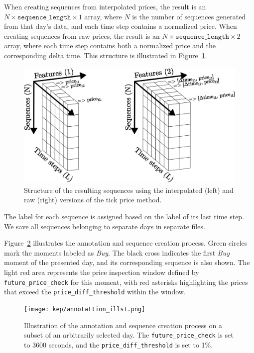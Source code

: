 \documentclass[a4paper,oneside,onecolumn,12pt]{book}
\begin{document}
		When creating sequences from interpolated prices, the result is an $N \times \texttt{sequence\_length} \times 1$ array, where $N$ is the number of sequences generated from that day's data, and each time step contains a normalized price. When creating sequences from raw prices, the result is an $N \times \texttt{sequence\_length} \times 2$ array, where each time step contains both a normalized price and the corresponding delta time. This structure is illustrated in Figure~\ref{fig:resulting_sequences}.
		\begin{figure}[H]
		\begin{center}
			\includegraphics[width=\linewidth]{kep/resulting_seq.png}
			\caption{Structure of the resulting sequences using the interpolated (left) and raw (right) versions of the tick price method.}
			\label{fig:resulting_sequences}
		\end{center}
		\end{figure}

		The label for each sequence is assigned based on the label of its last time step. We save all sequences belonging to separate days in separate files.

		Figure~\ref{fig:ann_seq_process} illustrates the annotation and sequence creation process. Green circles mark the moments labeled as \textit{Buy}. The black cross indicates the first \textit{Buy} moment of the presented day, and its corresponding sequence is also shown. The light red area represents the price inspection window defined by \texttt{future\_price\_check} for this moment, with red asterisks highlighting the prices that exceed the \texttt{price\_diff\_threshold} within the window.
		\begin{figure}[H]
		\begin{center}
			\texttt{[image: kep/annotattion\_illst.png]}
			\caption{Illustration of the annotation and sequence creation process on a subset of an arbitrarily selected day. The \texttt{future\_price\_check} is set to 3600 seconds, and the \texttt{price\_diff\_threshold} is set to 1\%.}
			\label{fig:ann_seq_process}
		\end{center}
		\end{figure}
\end{document}
